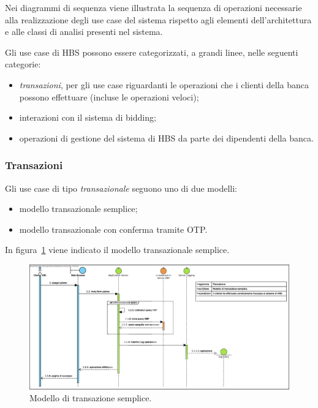 
Nei diagrammi di sequenza viene illustrata la sequenza di operazioni necessarie alla realizzazione degli use case del sistema rispetto agli elementi dell'architettura e alle classi di analisi presenti nel sistema.

Gli use case di HBS possono essere categorizzati, a grandi linee, nelle seguenti categorie:
\begin{itemize}
	\item \emph{transazioni}, per gli use case riguardanti le operazioni che i clienti della banca possono effettuare (incluse le operazioni veloci);

	\item interazioni con il sistema di bidding;

	\item operazioni di gestione del sistema di HBS da parte dei dipendenti della banca.
\end{itemize}

\subsubsection{Transazioni}

Gli use case di tipo \emph{transazionale} seguono uno di due modelli:
\begin{itemize}
	\item modello transazionale semplice;

	\item modello transazionale con conferma tramite OTP.
\end{itemize}

In figura~\ref{fig:sequence:transazione:modello} viene indicato il modello transazionale semplice.

\begin{figure}[h]
	\centering
	\includegraphics[width=\textheight, angle=90]{Images/sequence/Transazione.eps}
	\caption{Modello di transazione semplice.}
	\label{fig:sequence:transazione:modello}
\end{figure}

